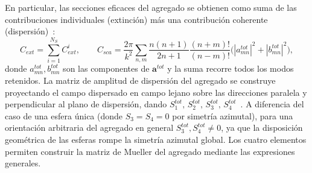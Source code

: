 En particular, las secciones eficaces del agregado se obtienen como
suma de las contribuciones individuales (extinción) más una contribución
coherente (dispersión)~\cite[ecs.~30--33]{Mackowski1991}:
\begin{equation}
  C_{ext} = \sum_{i=1}^{N_S} C_{ext}^{i},
  \qquad
  C_{sca} = \frac{2\pi}{k^2}\sum_{n,m}
    \frac{n(n+1)}{2n+1}\frac{(n+m)!}{(n-m)!}
    \bigl(|a_{mn}^{tot}|^2 + |b_{mn}^{tot}|^2\bigr),
\end{equation}
donde $a_{mn}^{tot}, b_{mn}^{tot}$ son las componentes de
$\mathbf{a}^{tot}$ y la suma recorre todos los modos retenidos. La
matriz de amplitud de dispersión del agregado se construye proyectando el
campo dispersado en campo lejano sobre las direcciones paralela y
perpendicular al plano de dispersión, dando
$S_1^{tot},\,S_2^{tot},\,S_3^{tot},\,S_4^{tot}$~\cite[ecs.~17--20]{Mackowski1996}.
A diferencia del caso de una esfera única (donde $S_3 = S_4 = 0$ por
simetría azimutal), para una orientación arbitraria del agregado en
general $S_3^{tot}, S_4^{tot} \neq 0$, ya que la disposición geométrica
de las esferas rompe la simetría azimutal global. Los cuatro elementos
permiten construir la matriz de Mueller del agregado mediante las
expresiones generales.